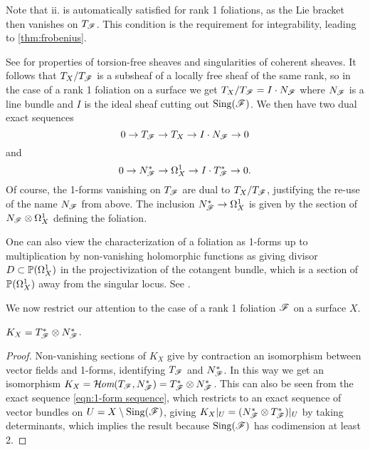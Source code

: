 \begin{remark}
    Note that ii. is automatically satisfied for rank 1 foliations, as the Lie
    bracket then vanishes on $T_\scrF$. This condition is the requirement for
    integrability, leading to \cref{thm:frobenius}.
\end{remark}

See \cite[\S2]{friedman_book} for properties of torsion-free sheaves and
singularities of coherent sheaves. It follows that $T_X/T_\scrF$ is a subsheaf
of a locally free sheaf of the same rank, so in the case of a rank 1 foliation
on a surface we get $T_X/T_\scrF=I\cdot N_\scrF$ where $N_\scrF$ is a line
bundle and $I$ is the ideal sheaf cutting out $\Sing(\scrF)$. We then have two
dual exact sequences
\begin{equation}\label{eqn:tangent sequence}
    0 \to T_\scrF \to T_X \to I\cdot N_\scrF \to 0
\end{equation}
and
\begin{equation}\label{eqn:1-form sequence}
    0 \to N_\scrF^* \to \Omega^1_X \to I\cdot T_\scrF^* \to 0.
\end{equation}
Of course, the 1-forms vanishing on $T_\scrF$ are dual to $T_X/T_\scrF$,
justifying the re-use of the name $N_\scrF$ from above. The inclusion
$N_\scrF^*\to\Omega^1_X$ is given by the section of $N_\scrF\otimes\Omega^1_X$
defining the foliation.

\begin{remark} %
    One can also view the characterization of a foliation as 1-forms up to
    multiplication by non-vanishing holomorphic functions as giving divisor
    $D\subset\P(\Omega^1_X)$ in the projectivization of the cotangent bundle,
    which is a section of $\P(\Omega^1_X)$ away from the singular locus. See
    \cite[\nopp II.0]{mcquillan_98}.
\end{remark}

We now restrict our attention to the case of a rank 1 foliation $\scrF$ on a
surface $X$.

\begin{proposition}\label{prop:canonical}
    $K_X=T_\scrF^*\otimes N_\scrF^*$.
\end{proposition}

\begin{proof}
    Non-vanishing sections of $K_X$ give by contraction an isomorphism between
    vector fields and 1-forms, identifying $T_\scrF$ and $N_\scrF^*$. In this
    way we get an isomorphism
    $K_X=\shHom(T_\scrF,N_\scrF^*)=T_\scrF^*\otimes N_\scrF^*$. This can also be
    seen from the exact sequence \cref{eqn:1-form sequence}, which restricts to
    an exact sequence of vector bundles on $U=X\setminus\Sing(\scrF)$, giving
    $K_X|_U=(N_\scrF^*\otimes T_\scrF^*)|_U$ by taking determinants, which
    implies the result because $\Sing(\scrF)$ has codimension at least 2.
\end{proof}


